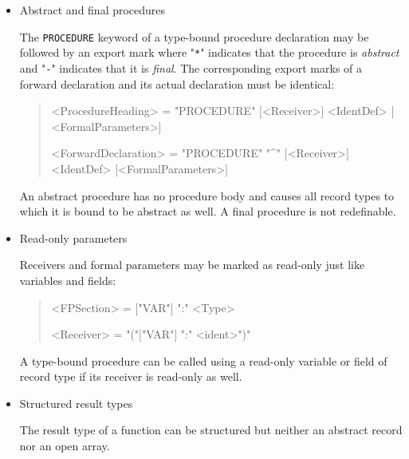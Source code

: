 
\begin{itemize}

\item Abstract and final procedures

The \texttt{PROCEDURE} keyword of a type-bound procedure declaration may be followed by an export mark where "\texttt{*}" indicates that the procedure is \emph{abstract} and "\texttt{-}" indicates that it is \emph{final}.
The corresponding export marks of a forward declaration and its actual declaration must be identical:

\begin{quote}\begin{grammar}
<ProcedureHeading> = "PROCEDURE" \changed{$[$"*"$\mid$"-"$]$} $[$<Receiver>$]$ <IdentDef> $[$<FormalParameters>$]$ \par
<ForwardDeclaration> = "PROCEDURE" \changed{$[$"*"$\mid$"-"$]$} "^" $[$<Receiver>$]$ <IdentDef> $[$<FormalParameters>$]$ \par
\end{grammar}\end{quote}

An abstract procedure has no procedure body and causes all record types to which it is bound to be abstract as well.
A final procedure is not redefinable.

\item Read-only parameters

Receivers and formal parameters may be marked as read-only just like variables and fields:

\begin{quote}\begin{grammar}
<FPSection> = $[$"VAR"$]$ ":" <Type> \par
<Receiver> = "("$[$"VAR"$]$ ":" <ident>")" \par
\end{grammar}\end{quote}

A type-bound procedure can be called using a read-only variable or field of record type if its receiver is read-only as well.

\item Structured result types

The result type of a function can be structured but neither an abstract record nor an open array.

\end{itemize}

